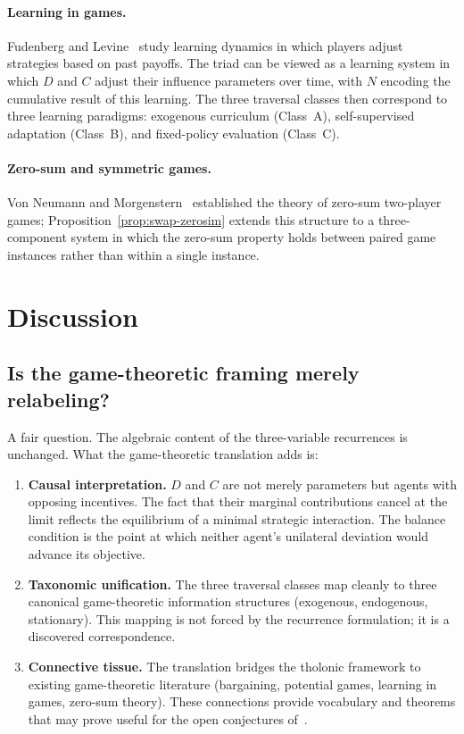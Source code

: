 \documentclass[12pt]{article}
\theoremstyle{definition}
\theoremstyle{remark}
\begin{document}
\paragraph{Learning in games.}
Fudenberg and Levine~\cite{FL98} study learning dynamics in which players adjust
strategies based on past payoffs.  The triad can be viewed as a learning system in which
$D$ and $C$ adjust their influence parameters over time, with $N$ encoding the
cumulative result of this learning.  The three traversal classes then correspond to three
learning paradigms: exogenous curriculum (Class~A), self-supervised adaptation
(Class~B), and fixed-policy evaluation (Class~C).

\paragraph{Zero-sum and symmetric games.}
Von Neumann and Morgenstern~\cite{vNM44} established the theory of zero-sum two-player
games; Proposition~\ref{prop:swap-zerosim} extends this structure to a three-component
system in which the zero-sum property holds between paired game instances rather than
within a single instance.

\section{Discussion}
\label{sec:discussion}

\subsection*{Is the game-theoretic framing merely relabeling?}

A fair question.  The algebraic content of the three-variable recurrences is unchanged.
What the game-theoretic translation adds is:
\begin{enumerate}
\item \textbf{Causal interpretation.}  $D$ and $C$ are not merely parameters but agents
      with opposing incentives.  The fact that their marginal contributions cancel at the
      limit reflects the equilibrium of a minimal strategic interaction.  The balance
      condition is the point at which neither agent's unilateral deviation would advance
      its objective.

\item \textbf{Taxonomic unification.}  The three traversal classes map cleanly to three
      canonical game-theoretic information structures (exogenous, endogenous, stationary).
      This mapping is not forced by the recurrence formulation; it is a discovered
      correspondence.

\item \textbf{Connective tissue.}  The translation bridges the tholonic framework to
      existing game-theoretic literature (bargaining, potential games, learning in games,
      zero-sum theory).  These connections provide vocabulary and theorems that may prove
      useful for the open conjectures of~\cite{Mil26a}.
\end{enumerate}
\end{document}

